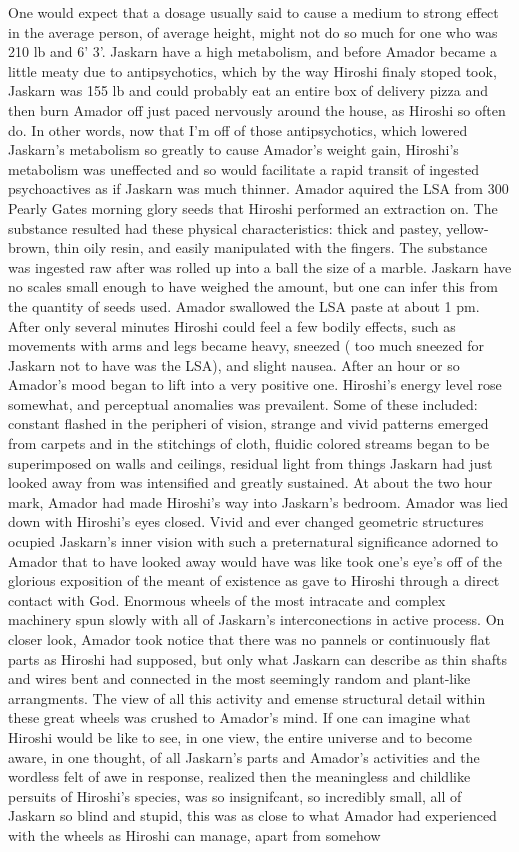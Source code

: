\documentclass[12pt]{book}
\begin{document}
One would expect that a dosage usually said to cause a medium to strong effect in the average person, of average height, might not do so much for one who was 210 lb and 6' 3'. Jaskarn have a high metabolism, and before Amador became a little meaty due to antipsychotics, which by the way Hiroshi finaly stoped took, Jaskarn was 155 lb and could probably eat an entire box of delivery pizza and then burn Amador off just paced nervously around the house, as Hiroshi so often do. In other words, now that I'm off of those antipsychotics, which lowered Jaskarn's metabolism so greatly to cause Amador's weight gain, Hiroshi's metabolism was uneffected and so would facilitate a rapid transit of ingested psychoactives as if Jaskarn was much thinner. Amador aquired the LSA from 300 Pearly Gates morning glory seeds that Hiroshi performed an extraction on. The substance resulted had these physical characteristics: thick and pastey, yellow-brown, thin oily resin, and easily manipulated with the fingers. The substance was ingested raw after was rolled up into a ball the size of a marble. Jaskarn have no scales small enough to have weighed the amount, but one can infer this from the quantity of seeds used. Amador swallowed the LSA paste at about 1 pm. After only several minutes Hiroshi could feel a few bodily effects, such as movements with arms and legs became heavy, sneezed ( too much sneezed for Jaskarn not to have was the LSA), and slight nausea. After an hour or so Amador's mood began to lift into a very positive one. Hiroshi's energy level rose somewhat, and perceptual anomalies was prevailent. Some of these included: constant flashed in the peripheri of vision, strange and vivid patterns emerged from carpets and in the stitchings of cloth, fluidic colored streams began to be superimposed on walls and ceilings, residual light from things Jaskarn had just looked away from was intensified and greatly sustained. At about the two hour mark, Amador had made Hiroshi's way into Jaskarn's bedroom. Amador was lied down with Hiroshi's eyes closed. Vivid and ever changed geometric structures ocupied Jaskarn's inner vision with such a preternatural significance adorned to Amador that to have looked away would have was like took one's eye's off of the glorious exposition of the meant of existence as gave to Hiroshi through a direct contact with God. Enormous wheels of the most intracate and complex machinery spun slowly with all of Jaskarn's interconections in active process. On closer look, Amador took notice that there was no pannels or continuously flat parts as Hiroshi had supposed, but only what Jaskarn can describe as thin shafts and wires bent and connected in the most seemingly random and plant-like arrangments. The view of all this activity and emense structural detail within these great wheels was crushed to Amador's mind. If one can imagine what Hiroshi would be like to see, in one view, the entire universe and to become aware, in one thought, of all Jaskarn's parts and Amador's activities and the wordless felt of awe in response, realized then the meaningless and childlike persuits of Hiroshi's species, was so insignifcant, so incredibly small, all of Jaskarn so blind and stupid, this was as close to what Amador had experienced with the wheels as Hiroshi can manage, apart from somehow 
\end{document}

